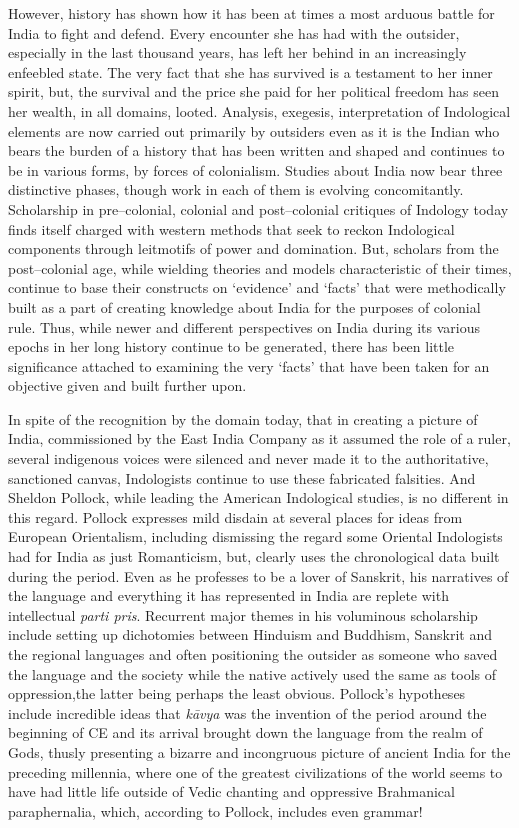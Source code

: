 However, history has shown how it has been at times a most arduous battle for India to fight and defend. Every encounter she has had with the outsider, especially in the last thousand years, has left her behind in an increasingly enfeebled state. The very fact that she has survived is a testament to her inner spirit, but, the survival and the price she paid for her political freedom has seen her wealth, in all domains, looted. Analysis, exegesis, interpretation of Indological elements are now carried out primarily by outsiders even as it is the Indian who bears the burden of a history that has been written and shaped and continues to be in various forms, by forces of colonialism. Studies about India now bear three distinctive phases, though work in each of them is evolving concomitantly. Scholarship in pre–colonial, colonial and post–colonial critiques of Indology today finds itself charged with western methods that seek to reckon Indological components through leitmotifs of power and domination. But, scholars from the post–colonial age, while wielding theories and models characteristic of their times, continue to base their constructs on ‘evidence’ and ‘facts’ that were methodically built as a part of creating knowledge about India for the purposes of colonial rule. Thus, while newer and different perspectives on India during its various epochs in her long history continue to be generated, there has been little significance attached to examining the very ‘facts’ that have been taken for an objective given and built further upon.

In spite of the recognition by the domain today, that in creating a picture of India, commissioned by the East India Company as it assumed the role of a ruler, several indigenous voices were silenced and never made it to the authoritative, sanctioned canvas, Indologists continue to use these fabricated falsities. And Sheldon Pollock, while leading the American Indological studies, is no different in this regard. Pollock expresses mild disdain at several places for ideas from European Orientalism, including dismissing the regard some Oriental Indologists had for India as just Romanticism, but, clearly uses the chronological data built during the period. Even as he professes to be a lover of Sanskrit, his narratives of the language and everything it has represented in India are replete with intellectual \textit{parti pris}. Recurrent major themes in his voluminous scholarship include setting up dichotomies between Hinduism and Buddhism, Sanskrit and the regional languages and often positioning the outsider as someone who saved the language and the society while the native actively used the same as tools of oppression,the latter being perhaps the least obvious. Pollock’s hypotheses include incredible ideas that \textit{kāvya} was the invention of the period around the beginning of CE and its arrival brought down the language from the realm of Gods, thusly presenting a bizarre and incongruous picture of ancient India for the preceding millennia, where one of the greatest civilizations of the world seems to have had little life outside of Vedic chanting and oppressive Brahmanical paraphernalia, which, according to Pollock, includes even grammar!

